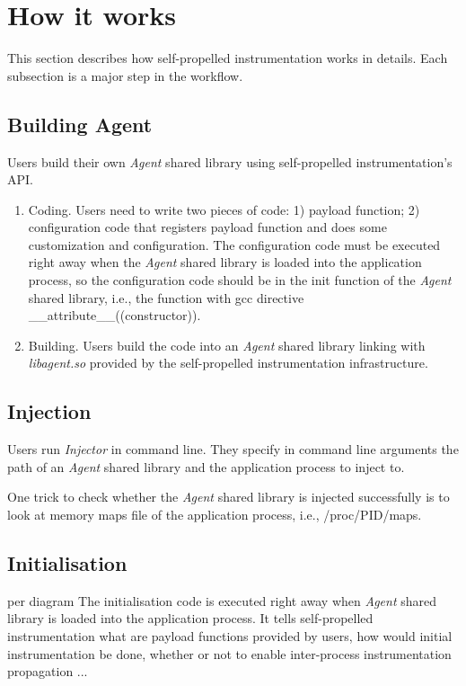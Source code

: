 \section{How it works}
This section describes how self-propelled instrumentation works in details.
Each subsection is a major step in the workflow.




\subsection{Building Agent}
Users build their own {\em Agent} shared library using self-propelled
instrumentation's API.
\begin{enumerate}
\item Coding. Users need to write two pieces of code: 1) payload function; 2)
  configuration code that registers payload function and does some
  customization
  and configuration. The configuration code must be executed right away
  when the
  {\em Agent} shared library is loaded into the application process, so the
  configuration code should be in the init function of the {\em Agent} shared
  library, i.e., the function with gcc directive
  \_\_attribute\_\_((constructor)).
\item Building. Users build the code into an {\em Agent} shared library linking
  with {\em libagent.so} provided by the self-propelled instrumentation
  infrastructure.
\end{enumerate}

\subsection{Injection}
Users run {\em Injector} in command line. They specify in command line
arguments
the path of an {\em Agent} shared library and the application process to inject
to.

One trick to check whether the {\em Agent} shared library is injected
successfully is to look at memory maps file of the application process, i.e.,
/proc/PID/maps.

\subsection{Initialisation} %
per diagram
The initialisation code is executed right away when {\em Agent} shared
library is
loaded into the application process.
It tells self-propelled instrumentation what are payload functions provided by
users, how would initial instrumentation be done, whether or not to enable
inter-process instrumentation propagation ...

